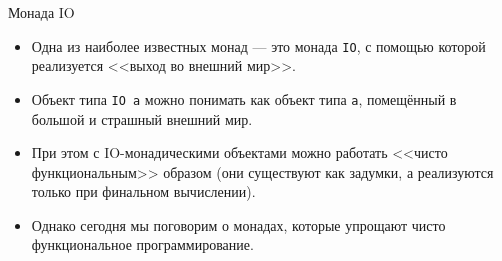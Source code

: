 \documentclass[xcolor=dvipsnames]{beamer}
\begin{document}
\begin{frame}{Монада IO}
 \begin{itemize}[<+->]
  \item Одна из наиболее известных монад --- это монада \texttt{IO}, с помощью которой реализуется <<выход во внешний мир>>. 
  \item Объект типа \texttt{IO a} можно понимать как объект типа \texttt{a}, помещённый в большой и страшный внешний мир.
  \item При этом с IO-монадическими объектами можно работать <<чисто функциональным>> образом (они существуют как задумки, а реализуются только при финальном вычислении).
  \item Однако сегодня мы поговорим о монадах, которые упрощают чисто функциональное программирование.
 \end{itemize}

 
\end{frame}

\end{document}
